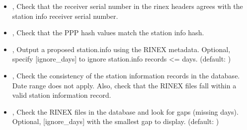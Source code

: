 \documentclass[letterpaper,10pt,english]{sphinxmanual}
\begin{document}
\begin{itemize}
\item {} 
\sphinxAtStartPar
{\hyperref[\detokenize{com:IntegrityCheck.py--stnr}]{}}, {\hyperref[\detokenize{com:IntegrityCheck.py---station_info_rinex}]{}} \sphinxhyphen{} Check that the receiver serial number in the rinex headers agrees with the station info receiver serial number.

\item {} 
\sphinxAtStartPar
{\hyperref[\detokenize{com:IntegrityCheck.py--stns}]{}}, {\hyperref[\detokenize{com:IntegrityCheck.py---station_info_solutions}]{}} \sphinxhyphen{} Check that the PPP hash values match the station info hash.

\item {} 
\sphinxAtStartPar
{\hyperref[\detokenize{com:IntegrityCheck.py--stnp}]{}} , {\hyperref[\detokenize{com:IntegrityCheck.py---station_info_proposed}]{}}  \sphinxhyphen{} Output a proposed station.info using the RINEX metadata. Optional, specify {[}ignore\_days{]} to ignore station.info records \textless{}= days. (default: )

\item {} 
\sphinxAtStartPar
{\hyperref[\detokenize{com:IntegrityCheck.py--stnc}]{}}, {\hyperref[\detokenize{com:IntegrityCheck.py---station_info_check}]{}} \sphinxhyphen{} Check the consistency of the station information records in the database. Date range does not apply. Also, check that the RINEX files fall within a valid station information record.

\item {} 
\sphinxAtStartPar
{\hyperref[\detokenize{com:IntegrityCheck.py--g}]{}} , {\hyperref[\detokenize{com:IntegrityCheck.py---data_gaps}]{}}  \sphinxhyphen{} Check the RINEX files in the database and look for gaps (missing days). Optional, {[}ignore\_days{]} with the smallest gap to display. (default: )


\end{itemize}
\end{document}
